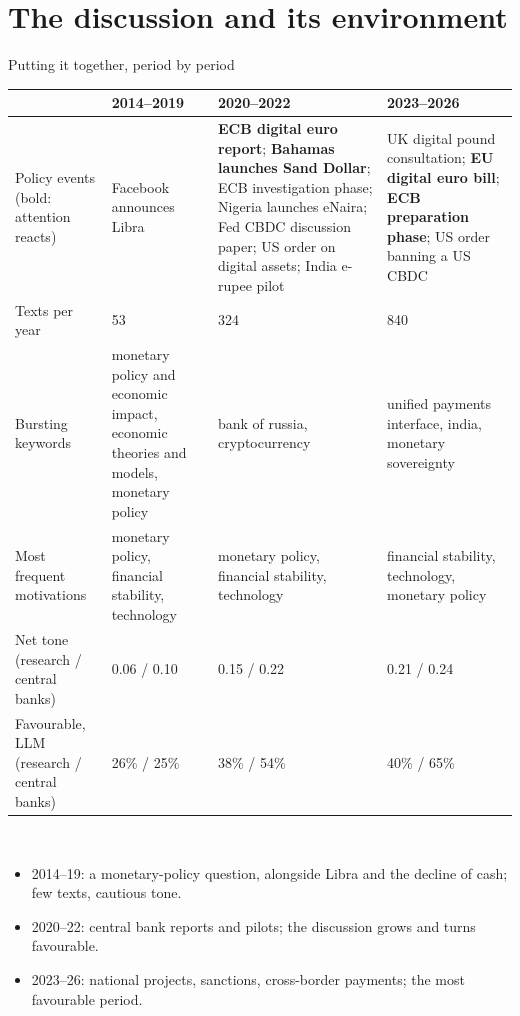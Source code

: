 \documentclass[aspectratio=169,10pt]{beamer}
\begin{document}
\section{The discussion and its environment}

\begin{frame}{Putting it together, period by period}
\scriptsize
\setlength{\tabcolsep}{4pt}
\tiny
\begin{tabular}{@{}p{}p{}p{}p{}@{}}\toprule
 & \textbf{2014--2019} & \textbf{2020--2022} & \textbf{2023--2026}\\\midrule
Policy events (bold: attention reacts) & Facebook announces Libra & \textbf{ECB digital euro report}; \textbf{Bahamas launches Sand Dollar}; ECB investigation phase; Nigeria launches eNaira; Fed CBDC discussion paper; US order on digital assets; India e-rupee pilot & UK digital pound consultation; \textbf{EU digital euro bill}; \textbf{ECB preparation phase}; US order banning a US CBDC \\
Texts per year & 53 & 324 & 840 \\
Bursting keywords & monetary policy and economic impact, economic theories and models, monetary policy & bank of russia, cryptocurrency & unified payments interface, india, monetary sovereignty \\
Most frequent motivations & monetary policy, financial stability, technology & monetary policy, financial stability, technology & financial stability, technology, monetary policy \\
Net tone (research / central banks) & 0.06 / 0.10 & 0.15 / 0.22 & 0.21 / 0.24 \\
Favourable, LLM (research / central banks) & 26\% / 25\% & 38\% / 54\% & 40\% / 65\% \\
\bottomrule\end{tabular}\\[2pt]
\scriptsize
\begin{itemize}\setlength\itemsep{0pt}
\item \alert{2014--19}: a monetary-policy question, alongside Libra and the decline of cash; few texts, cautious tone.
\item \alert{2020--22}: central bank reports and pilots; the discussion grows and turns favourable.
\item \alert{2023--26}: national projects, sanctions, cross-border payments; the most favourable period.
\end{itemize}
\end{frame}
\end{document}
